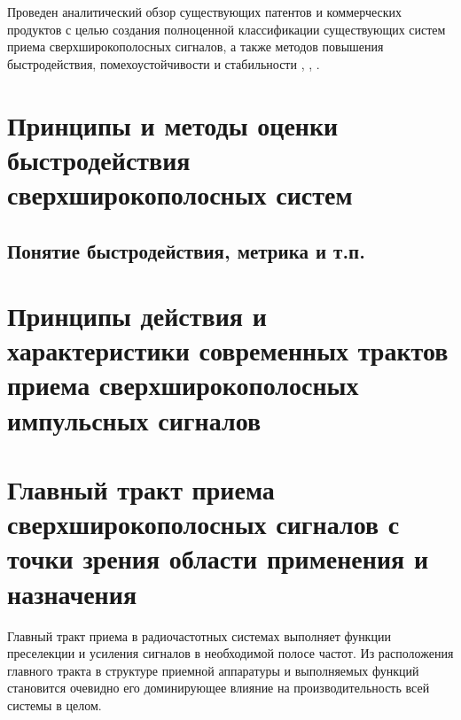 
Проведен аналитический обзор существующих патентов и коммерческих продуктов с целью создания полноценной классификации существующих систем приема сверхширокополосных сигналов, а также методов повышения быстродействия, помехоустойчивости и стабильности \cite{jia_4-bit_2020}, \cite{cheng_introduction_2021, lin_60-ghz_nodate, gray_analysis_2009}, \cite{nagulu_ultra-wideband_2021, rahimpour_design_2019, rucker_013m_2009, pelgrom_matching_1989-1, du_112-gss_2019, hartmann_low-power_2007, saha_6-20_2012, johansen_analysis_2005, shahramian_millimeter-wave_2011, du_256-gss_2018, dyskin_wideband_2016, noauthor_photonic_nodate, noauthor_microwave_2005}.

\section{Принципы и методы оценки быстродействия сверхширокополосных систем}

\subsection{Понятие быстродействия, метрика и т.п.}

\section{Принципы действия и характеристики современных трактов приема сверхширокополосных импульсных сигналов}

\section{Главный тракт приема сверхширокополосных сигналов с точки зрения области применения и назначения}
Главный тракт приема в радиочастотных системах выполняет функции преселекции и усиления сигналов в необходимой полосе частот. Из расположения главного тракта в структуре приемной аппаратуры и выполняемых функций становится очевидно его доминирующее влияние на производительность всей системы в целом.

